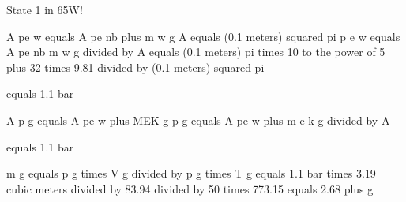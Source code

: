State 1 in 65W!  

A pe w equals A pe nb plus m w g  
A equals (0.1 meters) squared pi  
p e w equals A pe nb m w g divided by A equals (0.1 meters) pi times 10 to the power of 5 plus 32 times 9.81 divided by (0.1 meters) squared pi  

equals 1.1 bar  

A p g equals A pe w plus MEK g  
p g equals A pe w plus m e k g divided by A  

equals 1.1 bar  

m g equals p g times V g divided by p g times T g equals 1.1 bar times 3.19 cubic meters divided by 83.94 divided by 50 times 773.15 equals 2.68 plus g